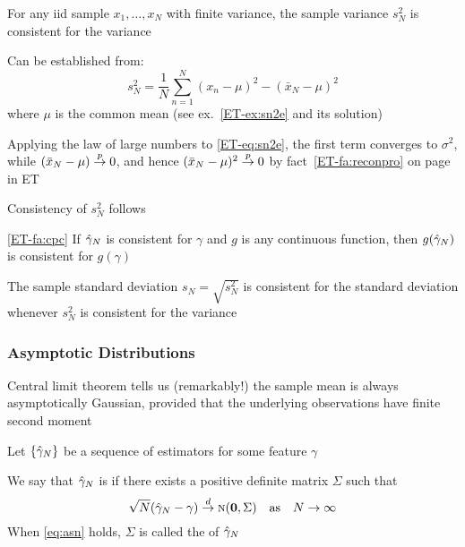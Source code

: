\begin{frame}

    \Eg
    For any {\sc iid} sample $x_1, \ldots, x_N$ with finite variance, the
    sample variance $s^2_N$ is consistent for the variance
    
    Can be
    established from:
    \begin{equation}
        \label{eq:sn2e}
        s_N^2 = \frac{1}{N} \sum_{n=1}^N (x_n - \mu)^2 - (\bar x_N - \mu)^2
    \end{equation}
    where $\mu$ is the common mean (see ex.~\ref{ET-ex:sn2e} and its
    solution)
    
    \vspace{.7em}
    Applying the law of large numbers to \eqref{ET-eq:sn2e}, the
    first term converges to $\sigma^2$,  while $(\bar x_N - \mu)
    \stackrel { p } {\to} 0$, and hence $(\bar x_N - \mu)^2 \stackrel { p } {\to} 0$ by 
    fact~\ref{ET-fa:reconpro} on page~\pageref{ET-fa:reconpro} in ET
    
    Consistency of $s^2_N$ follows

\end{frame}

\begin{frame}

    \vspace{2em}
    \Fact\eqref{ET-fa:cpc}
    If $\hat \gamma_N$ is consistent for $\gamma$ and $g$ is any continuous
    function, then $g(\hat \gamma_N)$ is consistent for $g(\gamma)$

    \vspace{.7em}
    \Eg
    The sample standard deviation $s_N = \sqrt{s^2_N}$ is consistent for the
    standard deviation whenever $s^2_N$ is consistent for the variance
    
\end{frame}

\begin{frame}\frametitle{Asymptotic Distributions}

    \vspace{2em}
    Central limit theorem tells us
    (remarkably!) the sample mean is always asymptotically Gaussian, provided
    that the underlying observations have finite second moment
    
    Let $\{\hat \gamma_N\}$ be a sequence of estimators 
    for some feature $\gamma$
    
    \vspace{.7em}
    We say that $\hat \gamma_N$ is
     if
    there exists a positive definite matrix $\Sigma$ such that
    \begin{equation}
        \label{eq:asn}
        \sqrt{N} (\hat \gamma_N - \gamma) \stackrel { d } {\to} \textrm{\sc n}({\mathbf 0}, \Sigma)  
        \quad \text{as} \quad
        N \to \infty
    \end{equation}
    When \eqref{eq:asn} holds, $\Sigma$ is called the  of $\hat \gamma_N$
    
\end{frame}

